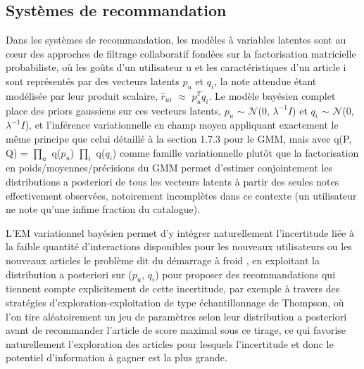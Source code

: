 \subsection{Systèmes de recommandation}
Dans les systèmes de recommandation, les modèles à variables latentes sont au cœur des approches de filtrage collaboratif fondées sur la factorisation matricielle probabiliste, où les goûts d'un utilisateur u et les caractéristiques d'un article i sont représentés par des vecteurs latents $p_{u}$ et $q_{i}$, la note attendue étant modélisée par leur produit scalaire, $\hat{r}$$_{ui}$ $\approx $ $p_{u}^{T}q_{i}$. Le modèle bayésien complet place des priors gaussiens sur ces vecteurs latents, $p_{u}$ $\sim $ $\mathcal{N}$(0, $\lambda ^{-1}I$) et $q_{i}$ $\sim $ $\mathcal{N}$(0, $\lambda ^{-1}I$), et l'inférence variationnelle en champ moyen  appliquant exactement le même principe que celui détaillé à la section 1.7.3 pour le GMM, mais avec q(P, Q) = $\prod _{u}$ q($p_{u}$) $\prod _{i}$ q($q_{i}$) comme famille variationnelle plutôt que la factorisation en poids/moyennes/précisions du GMM  permet d'estimer conjointement les distributions a posteriori de tous les vecteurs latents à partir des seules notes effectivement observées, notoirement incomplètes dans ce contexte (un utilisateur ne note qu'une infime fraction du catalogue).

L'EM variationnel bayésien permet d'y intégrer naturellement l'incertitude liée à la faible quantité d'interactions disponibles pour les nouveaux utilisateurs ou les nouveaux articles  le problème dit du démarrage à froid , en exploitant la distribution a posteriori sur ($p_{u}$, $q_{i}$) pour proposer des recommandations qui tiennent compte explicitement de cette incertitude, par exemple à travers des stratégies d'exploration-exploitation de type échantillonnage de Thompson, où l'on tire aléatoirement un jeu de paramètres selon leur distribution a posteriori avant de recommander l'article de score maximal sous ce tirage, ce qui favorise naturellement l'exploration des articles pour lesquels l'incertitude  et donc le potentiel d'information à gagner  est la plus grande.

